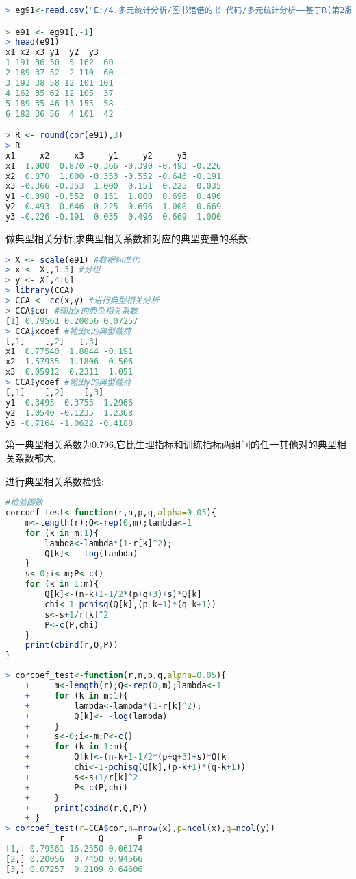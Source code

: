 \documentclass[11pt,a4paper,oneside]{book}
\begin{document}
\begin{lstlisting}[language=r]
> eg91<-read.csv("E:/4.多元统计分析/图书馆借的书 代码/多元统计分析——基于R(第2版) R-data/eg9.1.csv")

> e91 <- eg91[,-1]
> head(e91)
x1 x2 x3 y1  y2  y3
1 191 36 50  5 162  60
2 189 37 52  2 110  60
3 193 38 58 12 101 101
4 162 35 62 12 105  37
5 189 35 46 13 155  58
6 182 36 56  4 101  42

> R <- round(cor(e91),3)
> R
x1     x2     x3     y1     y2     y3
x1  1.000  0.870 -0.366 -0.390 -0.493 -0.226
x2  0.870  1.000 -0.353 -0.552 -0.646 -0.191
x3 -0.366 -0.353  1.000  0.151  0.225  0.035
y1 -0.390 -0.552  0.151  1.000  0.696  0.496
y2 -0.493 -0.646  0.225  0.696  1.000  0.669
y3 -0.226 -0.191  0.035  0.496  0.669  1.000
\end{lstlisting}

做典型相关分析,求典型相关系数和对应的典型变量的系数:
\begin{lstlisting}[language=r]
> X <- scale(e91) #数据标准化
> x <- X[,1:3] #分组
> y <- X[,4:6]
> library(CCA)
> CCA <- cc(x,y) #进行典型相关分析
> CCA$cor #输出x的典型相关系数
[1] 0.79561 0.20056 0.07257
> CCA$xcoef #输出x的典型载荷
[,1]    [,2]   [,3]
x1  0.77540  1.8844 -0.191
x2 -1.57935 -1.1806  0.506
x3  0.05912  0.2311  1.051
> CCA$ycoef #输出y的典型载荷
[,1]    [,2]    [,3]
y1  0.3495  0.3755 -1.2966
y2  1.0540 -0.1235  1.2368
y3 -0.7164 -1.0622 -0.4188
\end{lstlisting}
第一典型相关系数为0.796,它比生理指标和训练指标两组间的任一其他对的典型相关系数都大.

进行典型相关系数检验:
\begin{lstlisting}[language=r]
#检验函数
corcoef_test<-function(r,n,p,q,alpha=0.05){
	m<-length(r);Q<-rep(0,m);lambda<-1
	for (k in m:1){
		lambda<-lambda*(1-r[k]^2);
		Q[k]<- -log(lambda)
	}
	s<-0;i<-m;P<-c()
	for (k in 1:m){
		Q[k]<-(n-k+1-1/2*(p+q+3)+s)*Q[k]
		chi<-1-pchisq(Q[k],(p-k+1)*(q-k+1))
		s<-s+1/r[k]^2
		P<-c(P,chi)
	}
	print(cbind(r,Q,P))
}
\end{lstlisting}
\begin{lstlisting}[language=r]
> corcoef_test<-function(r,n,p,q,alpha=0.05){
	+     m<-length(r);Q<-rep(0,m);lambda<-1
	+     for (k in m:1){
	+         lambda<-lambda*(1-r[k]^2);
	+         Q[k]<- -log(lambda)
	+     }
	+     s<-0;i<-m;P<-c()
	+     for (k in 1:m){
	+         Q[k]<-(n-k+1-1/2*(p+q+3)+s)*Q[k]
	+         chi<-1-pchisq(Q[k],(p-k+1)*(q-k+1))
	+         s<-s+1/r[k]^2
	+         P<-c(P,chi)
	+     }
	+     print(cbind(r,Q,P))
	+ }
> corcoef_test(r=CCA$cor,n=nrow(x),p=ncol(x),q=ncol(y))
           r       Q       P
[1,] 0.79561 16.2550 0.06174
[2,] 0.20056  0.7450 0.94566
[3,] 0.07257  0.2109 0.64606
\end{lstlisting}
\end{document}
